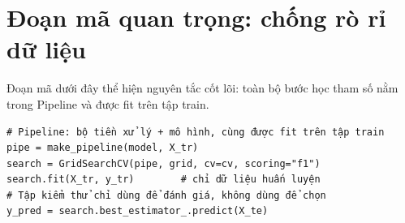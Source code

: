 \section{Đoạn mã quan trọng: chống rò rỉ dữ liệu}
Đoạn mã dưới đây thể hiện nguyên tắc cốt lõi: toàn bộ bước học tham số nằm trong Pipeline và được fit trên tập train.
\begin{verbatim}
# Pipeline: bộ tiền xử lý + mô hình, cùng được fit trên tập train
pipe = make_pipeline(model, X_tr)
search = GridSearchCV(pipe, grid, cv=cv, scoring="f1")
search.fit(X_tr, y_tr)        # chỉ dữ liệu huấn luyện
# Tập kiểm thử chỉ dùng để đánh giá, không dùng để chọn
y_pred = search.best_estimator_.predict(X_te)
\end{verbatim}
